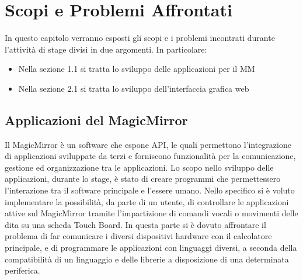 \chapter{Scopi e Problemi Affrontati}\label{capitolo1}
In questo capitolo verranno esposti gli scopi e i problemi incontrati durante l'attivit\`a di stage divisi in due argomenti.
In particolare:
\begin{itemize}
\item Nella sezione 1.1 si tratta lo sviluppo delle applicazioni per il MM
\item Nella sezione 2.1 si tratta lo sviluppo dell'interfaccia grafica web
\end{itemize}
\section{Applicazioni del MagicMirror}
Il MagicMirror \`e un software che espone API, le quali permettono
l'integrazione di applicazioni sviluppate da terzi e forniscono funzionalit\`a per la comunicazione, gestione
ed organizzazione tra le applicazioni.
Lo scopo nello sviluppo delle applicazioni, durante lo stage, \`e stato
di creare programmi che permettessero l'interazione tra il software principale
e l'essere umano. Nello specifico si \`e voluto implementare la possibilit\`a, da parte di un utente,
di controllare le applicazioni attive sul MagicMirror tramite l'impartizione di comandi vocali
o movimenti delle dita su una scheda Touch Board.
In questa parte si \`e dovuto affrontare il problema di far comunicare
i diversi dispositivi hardware con il calcolatore principale, e di programmare
le applicazioni con linguaggi diversi, a seconda della compatibilit\`a di un linguaggio
e delle librerie a disposizione di una determinata periferica.
\\[2\baselineskip]
